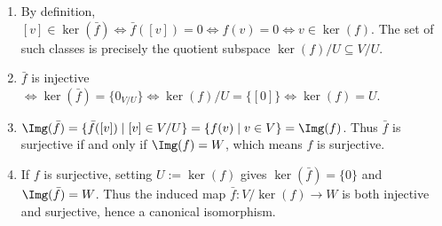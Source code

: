 \begin{exercisesolution}
\label{sol:properties_induced_quotient_maps}
\begin{enumerate}[label=\textbf{(\alph*)}]
    \item By definition, $[v] \in \ker(\bar{f}) \iff \bar{f}([v]) = 0 \iff f(v) = 0 \iff v \in \ker(f)$.
    The set of such classes is precisely the quotient subspace $\ker(f)/U \subseteq V/U$.

    \item $\bar{f}$ is injective $\iff \ker(\bar{f}) = \{0_{V/U}\} \iff \ker(f)/U = \{[0]\} \iff \ker(f) = U$.

    \item $\Img(\bar{f}) = \{\bar{f}([v]) \mid [v] \in V/U\} = \{f(v) \mid v \in V\} = \Img(f)$.
    Thus $\bar{f}$ is surjective if and only if $\Img(f) = W$, which means $f$ is surjective.

    \item If $f$ is surjective, setting $U := \ker(f)$ gives $\ker(\bar{f}) = \{0\}$ and $\Img(\bar{f}) = W$.
    Thus the induced map $\bar{f} \colon V/\ker(f) \to W$ is both injective and surjective, hence a canonical isomorphism. \qedhere
\end{enumerate}
\end{exercisesolution}

